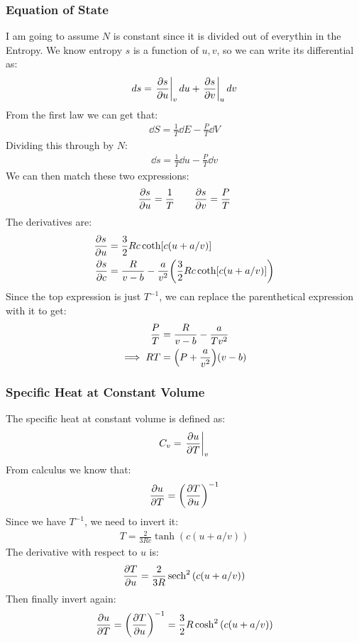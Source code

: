 \documentclass[12pt]{article}
\begin{document}
\subsubsection{Equation of State}
I am going to assume $N$ is constant since it is divided out of everythin in the Entropy. We know entropy $s$ is a function of $u,v$, so we can write its differential as:
\begin{align*}
  \dd{s}=\eval{\pdv{s}{u}}_v\dd{u}+\eval{\pdv{s}{v}}_u\dd{v}
\end{align*}
From the first law we can get that:
\begin{align*}
  \dd{S}=\frac1T\dd{E}-\frac{P}{T}\dd{V}
\end{align*}
Dividing this through by $N$:
\begin{align*}
  \dd{s}=\frac1T\dd{u}-\frac{P}{T}\dd{v}
\end{align*}
We can then match these two expressions:
\begin{align*}
  \pdv{s}{u}=\frac1T\qquad\pdv{s}{v}=\frac{P}{T}
\end{align*}
The derivatives are:
\begin{align*}
  \pdv{s}{u}&=\frac32Rc\coth[c(u+a/v)]\\
  \pdv{s}{c}&=\frac{R}{v-b}-\frac{a}{v^2}\qty(\frac32Rc\coth[c(u+a/v)])
\end{align*}
Since the top expression is just $T^{-1}$, we can replace the parenthetical expression with it to get:
\begin{align*}
  \frac{P}{T}&=\frac{R}{v-b}-\frac{a}{Tv^2}\\
  \implies RT&=\qty(P+\frac{a}{v^2})(v-b)
\end{align*}
\subsubsection{Specific Heat at Constant Volume}
The specific heat at constant volume is defined as:
\begin{align*}
  C_v=\eval{\pdv{u}{T}}_v
\end{align*}
From calculus we know that:
\begin{align*}
  \pdv{u}{T}=\qty(\pdv{T}{u})^{-1}
\end{align*}
Since we have $T^{-1}$, we need to invert it:
\begin{align*}
  T=\frac2{3Rc}\tanh(c(u+a/v))
\end{align*}
The derivative with respect to $u$ is:
\begin{align*}
  \pdv{T}{u}=\frac{2}{3R}\sech^2\qty(c(u+a/v))
\end{align*}
Then finally invert again:
\begin{align*}
  \pdv{u}{T}=\qty(\pdv{T}{u})^{-1}=\frac32R\cosh^2\qty(c(u+a/v))
\end{align*}
\end{document}

